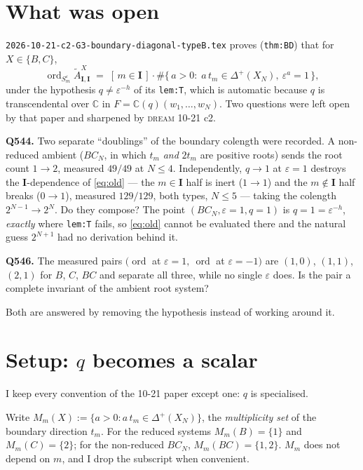 \documentclass[11pt]{article}
\theoremstyle{definition}
\theoremstyle{remark}
\DeclareMathOperator{\ord}{ord}
\newcommand{\At}{\widetilde{A}}
\newcommand{\bI}{\mathbf{I}}
\begin{document}
\section{What was open}

\texttt{2026-10-21-c2-G3-boundary-diagonal-typeB.tex} proves (\texttt{thm:BD}) that for
$X\in\{B,C\}$,
\begin{equation}
  \ord_{S^{\varepsilon}_m}\At^{X}_{\bI,\bI}
  \;=\;[\,m\in\bI\,]\cdot
  \#\{\,a>0:\;a\,t_m\in\Delta^{+}(X_N),\ \varepsilon^{a}=1\,\},
  \label{eq:old}
\end{equation}
under the hypothesis $q\ne\varepsilon^{-h}$ of its \texttt{lem:T}, which is automatic
because $q$ is transcendental over $\mathbb{C}$ in $F=\mathbb{C}(q)(w_1,\dots,w_N)$.  Two
questions were left open by that paper and sharpened by \textsc{dream} 10-21 c2.

\textbf{Q544.} Two separate ``doublings'' of the boundary colength were recorded.  A
non-reduced ambient ($BC_N$, in which $t_m$ \emph{and} $2t_m$ are positive roots) sends
the root count $1\to2$, measured $49/49$ at $N\le4$.  Independently, $q\to1$ at
$\varepsilon=1$ destroys the $\bI$-dependence of \eqref{eq:old} --- the $m\in\bI$ half is
inert ($1\to1$) and the $m\notin\bI$ half breaks ($0\to1$), measured $129/129$, both types,
$N\le5$ --- taking the colength $2^{N-1}\to2^{N}$.  Do they compose?  The point
$(BC_N,\varepsilon=1,q=1)$ is $q=1=\varepsilon^{-h}$, \emph{exactly} where \texttt{lem:T}
fails, so \eqref{eq:old} cannot be evaluated there and the natural guess $2^{N+1}$ had no
derivation behind it.

\textbf{Q546.} The measured pairs $(\ord$ at $\varepsilon=1,\ \ord$ at $\varepsilon=-1)$
are $(1,0)$, $(1,1)$, $(2,1)$ for $B$, $C$, $BC$ and separate all three, while no single
$\varepsilon$ does.  Is the pair a complete invariant of the ambient root system?

Both are answered by removing the hypothesis instead of working around it.

\section{Setup: $q$ becomes a scalar}

I keep every convention of the 10-21 paper except one: $q$ is specialised.

Write $M_m(X):=\{a>0: a\,t_m\in\Delta^{+}(X_N)\}$, the \emph{multiplicity set} of the
boundary direction $t_m$.  For the reduced systems $M_m(B)=\{1\}$ and $M_m(C)=\{2\}$; for
the non-reduced $BC_N$, $M_m(BC)=\{1,2\}$.  $M_m$ does not depend on $m$, and I drop the
subscript when convenient.
\end{document}
